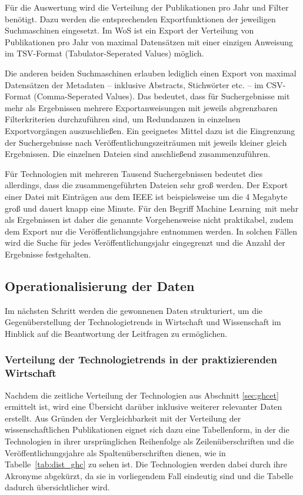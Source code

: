 Für die Auswertung wird die Verteilung der Publikationen pro Jahr und Filter benötigt. Dazu werden die entsprechenden Exportfunktionen der jeweiligen Suchmaschinen eingesetzt. Im WoS ist ein Export der Verteilung von Publikationen pro Jahr von maximal  Datensätzen mit einer einzigen Anweisung im TSV-Format (Tabulator-Seperated Values) möglich.

Die anderen beiden Suchmaschinen erlauben lediglich einen Export von maximal  Datensätzen der Metadaten -- inklusive Abstracts, Stichwörter etc. -- im CSV-Format (Comma-Seperated Values). Das bedeutet, dass für Suchergebnisse mit mehr als  Ergebnissen mehrere Exportanweisungen mit jeweils abgrenzbaren Filterkriterien durchzuführen sind, um Redundanzen in einzelnen Exportvorgängen auszuschließen. Ein geeignetes Mittel dazu ist die Eingrenzung der Suchergebnisse nach Veröffentlichungs\-zeiträumen mit jeweils kleiner gleich  Ergebnissen. Die einzelnen Dateien sind anschließend zusammenzuführen.

Für Technologien mit mehreren Tausend Such\-ergebnissen bedeutet dies allerdings, dass die zusammengeführten Dateien sehr groß werden. Der Export einer Datei mit  Einträgen aus dem IEEE ist beispielsweise um die 4 Megabyte groß und dauert knapp eine Minute. Für den Begriff \glqq Machine Learning\grqq~mit mehr als  Ergebnissen ist daher die genannte Vorgehensweise nicht praktikabel, zudem dem Export nur die Veröffentlichungsjahre entnommen werden. In solchen Fällen wird die Suche für jedes Veröffentlichungsjahr eingegrenzt und die Anzahl der Ergebnisse festgehalten.

\subsection{Operationalisierung der Daten}
Im nächsten Schritt werden die gewonnenen Daten strukturiert, um die Gegenüberstellung der Technologietrends in Wirtschaft und Wissenschaft im Hinblick auf die Beantwortung der Leitfragen zu ermöglichen.

\subsubsection{Verteilung der Technologietrends in der praktizierenden Wirtschaft}
Nachdem die zeitliche Verteilung der Technologien aus Abschnitt \ref{sec:ghcet} ermittelt ist, wird eine Übersicht darüber inklusive weiterer relevanter Daten erstellt. Aus Gründen der Vergleichbarkeit mit der Verteilung der wissenschaftlichen Publikationen eignet sich dazu eine Tabellenform, in der die Technologien in ihrer ursprünglichen Reihenfolge als Zeilenüberschriften und die Veröffentlichungsjahre als Spaltenüberschriften dienen, wie in Tabelle~\ref{tab:dist_ghc} zu sehen ist. Die Technologien werden dabei durch ihre Akronyme abgekürzt, da sie in vorliegendem Fall eindeutig sind und die Tabelle dadurch übersichtlicher wird.

